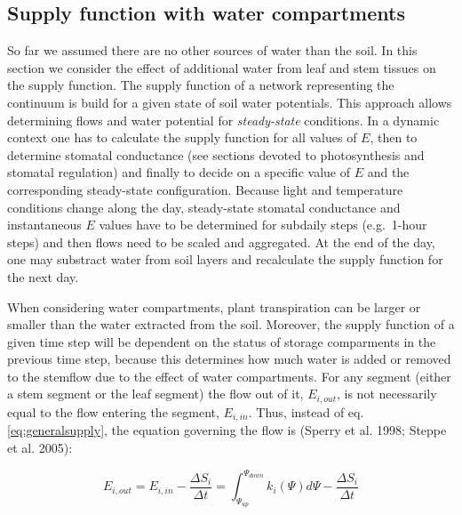 \documentclass[]{book}
\begin{document}
\subsection{Supply function with water
compartments}\label{supply-function-with-water-compartments}

So far we assumed there are no other sources of water than the soil. In
this section we consider the effect of additional water from leaf and
stem tissues on the supply function. The supply function of a network
representing the continuum is build for a given state of soil water
potentials. This approach allows determining flows and water potential
for \emph{steady-state} conditions. In a dynamic context one has to
calculate the supply function for all values of \(E\), then to determine
stomatal conductance (see sections devoted to photosynthesis and
stomatal regulation) and finally to decide on a specific value of \(E\)
and the corresponding steady-state configuration. Because light and
temperature conditions change along the day, steady-state stomatal
conductance and instantaneous \(E\) values have to be determined for
subdaily steps (e.g.~1-hour steps) and then flows need to be scaled and
aggregated. At the end of the day, one may substract water from soil
layers and recalculate the supply function for the next day.

When considering water compartments, plant transpiration can be larger
or smaller than the water extracted from the soil. Moreover, the supply
function of a given time step will be dependent on the status of storage
comparments in the previous time step, because this determines how much
water is added or removed to the stemflow due to the effect of water
compartments. For any segment (either a stem segment or the leaf
segment) the flow out of it, \(E_{i,out}\), is not necessarily equal to
the flow entering the segment, \(E_{i, in}\). Thus, instead of eq.
\ref{eq:generalsupply}, the equation governing the flow is (Sperry et
al. 1998; Steppe et al. 2005):

\begin{equation}
E_{i,out} = E_{i, in} - \frac{\Delta S_{i}}{\Delta t} = \int_{\Psi_{up}}^{\Psi_{down}}{k_i(\Psi) d\Psi} - \frac{\Delta S_{i}}{\Delta t}
\end{equation}
\end{document}
